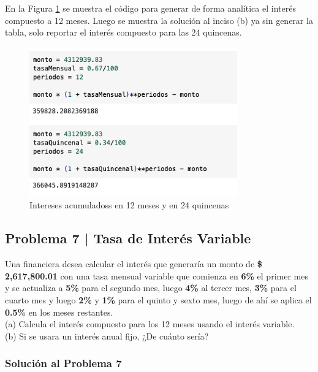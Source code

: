 \documentclass{article}
\begin{document}
\break
\noindent
En la Figura \ref{fig:s106-3} se muestra el código para generar de forma analítica el interés compuesto a 12 meses. Luego se muestra la solución al inciso (b) ya sin generar la tabla, solo reportar el interés compuesto para las 24 quincenas.
\begin{figure}[!ht]
    \centering
    \begin{minipage}{\textwidth}
        \centering
        \includegraphics[width=0.8\textwidth]{figures/s106-3.png}
    \end{minipage}
    \captionsetup{width=0.9\textwidth}
    \caption{Intereses acumuladoss en 12 meses y en 24 quincenas}
    \label{fig:s106-3}
\end{figure}

\clearpage

\subsection*{Problema 7 | Tasa de Interés Variable}

Una financiera desea calcular el interés que generaría un monto de \textbf{\$ 2,617,800.01} con una tasa mensual variable que comienza en \textbf{6\%} el primer mes y se actualiza a \textbf{5\%} para el segundo mes, luego \textbf{4\%} al tercer mes, \textbf{3\%} para el cuarto mes y luego \textbf{2\%} y \textbf{1\%} para el quinto y sexto mes, luego de ahí se aplica el \textbf{0.5\%} en los meses restantes.
\\[12pt]
(a) Calcula el interés compuesto para los 12 meses usando el interés variable. 
\\[6pt]
(b) Si se usara un interés anual fijo, ¿De cuánto sería?

\clearpage

\subsubsection*{Solución al Problema 7}
\end{document}
